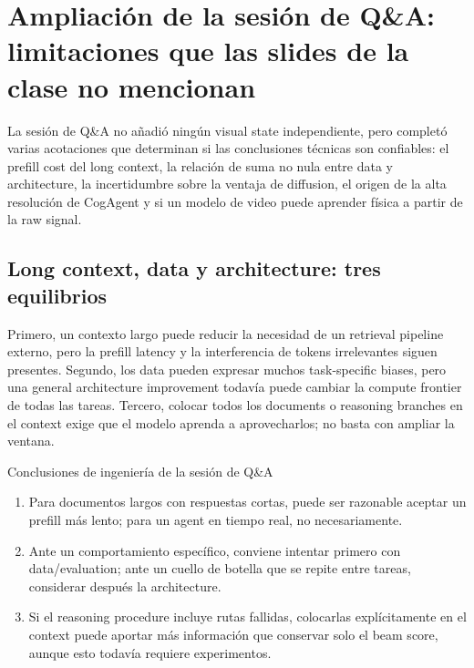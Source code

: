 \documentclass[a4paper]{article}
\begin{document}
\section{Ampliación de la sesión de Q\&A: limitaciones que las slides de la clase no mencionan}

La sesión de Q\&A no añadió ningún visual state independiente, pero completó varias acotaciones que determinan si las conclusiones técnicas son confiables: el prefill cost del long context, la relación de suma no nula entre data y architecture, la incertidumbre sobre la ventaja de diffusion, el origen de la alta resolución de CogAgent y si un modelo de video puede aprender física a partir de la raw signal.

\subsection{Long context, data y architecture: tres equilibrios}

Primero, un contexto largo puede reducir la necesidad de un retrieval pipeline externo, pero la prefill latency y la interferencia de tokens irrelevantes siguen presentes. Segundo, los data pueden expresar muchos task-specific biases, pero una general architecture improvement todavía puede cambiar la compute frontier de todas las tareas. Tercero, colocar todos los documents o reasoning branches en el context exige que el modelo aprenda a aprovecharlos; no basta con ampliar la ventana.

\begin{importantbox}{Conclusiones de ingeniería de la sesión de Q\&A}
\begin{enumerate}
  \item Para documentos largos con respuestas cortas, puede ser razonable aceptar un prefill más lento; para un agent en tiempo real, no necesariamente.
  \item Ante un comportamiento específico, conviene intentar primero con data/evaluation; ante un cuello de botella que se repite entre tareas, considerar después la architecture.
  \item Si el reasoning procedure incluye rutas fallidas, colocarlas explícitamente en el context puede aportar más información que conservar solo el beam score, aunque esto todavía requiere experimentos.
\end{enumerate}
\end{importantbox}

\end{document}

